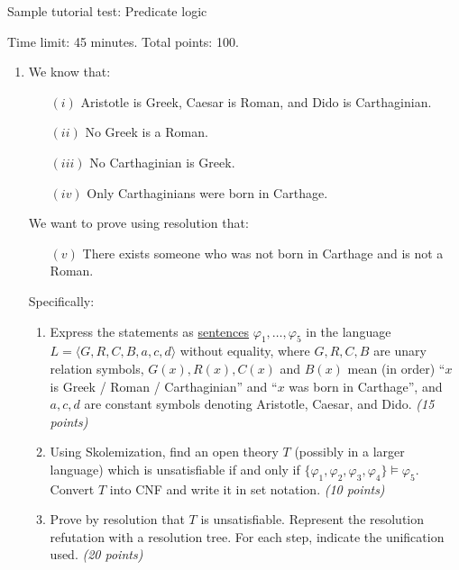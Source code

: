 \documentclass[a4paper]{article}
\begin{document}
\thispagestyle{empty}

\begin{center}
    \large{Sample tutorial test: Predicate logic}    
\end{center}

Time limit: 45 minutes. Total points: 100.

\bigskip

\begin{enumerate}

\item We know that:
\begin{enumerate}
    \item[$(i)$] Aristotle is Greek, Caesar is Roman, and Dido is Carthaginian.
    \item[$(ii)$] No Greek is a Roman.
    \item[$(iii)$] No Carthaginian is Greek.
    \item[$(iv)$] Only Carthaginians were born in Carthage.
\end{enumerate}
    
We want to prove using resolution that:
    
\begin{enumerate}
    \item[$(v)$] There exists someone who was not born in Carthage and is not a Roman.
\end{enumerate}
    
Specifically:
\begin{enumerate}
\item Express the statements as \underline{sentences} $\varphi_1, \dots, \varphi_5$ in the language $L=\langle G, R, C, B, a, c, d \rangle$ without equality, where $G, R, C, B$ are unary relation symbols, $G(x), R(x), C(x)$ and $B(x)$ mean (in order) ``$x$ is Greek / Roman / Carthaginian'' and ``$x$ was born in Carthage'', and $a, c, d$ are constant symbols denoting Aristotle, Caesar, and Dido. {\it (15 points)}
    \item Using Skolemization, find an open theory $T$ (possibly in a larger language) which is unsatisfiable if and only if $\{\varphi_1, \varphi_2, \varphi_3, \varphi_4\} \models \varphi_5$. Convert $T$ into CNF and write it in set notation. {\it (10 points)}
    \item Prove by resolution that $T$ is unsatisfiable. Represent the resolution refutation with a resolution tree. For each step, indicate the unification used. {\it (20 points)}
\end{enumerate}


\end{enumerate}
\end{document}
